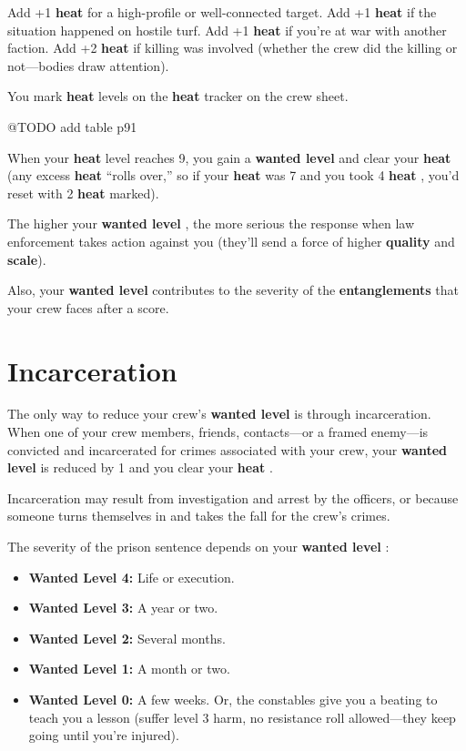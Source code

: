 \documentclass[11pt,oneside]{book}
\newcommand{\gameterm}[1]{\textbf{#1}}
\begin{document}
Add +1 \gameterm{heat}  for a high-profile or well-connected target. Add +1 \gameterm{heat}  if the situation happened on hostile turf. Add +1 \gameterm{heat}  if you’re at war with another faction. Add +2 \gameterm{heat}  if killing was involved (whether the crew did the killing or not---bodies draw attention).

You mark \gameterm{heat}  levels on the \gameterm{heat}  tracker on the crew sheet.

@TODO add table p91

When your \gameterm{heat}  level reaches 9, you gain a \gameterm{wanted level}  and clear your \gameterm{heat}  (any excess \gameterm{heat}  “rolls over,” so if your \gameterm{heat}  was 7 and you took 4 \gameterm{heat} , you’d reset with 2 \gameterm{heat}  marked).

The higher your \gameterm{wanted level} , the more serious the response when law enforcement takes action against you (they’ll send a force of higher \textbf{quality} and \textbf{scale}).

Also, your \gameterm{wanted level}  contributes to the severity of the \textbf{entanglements} that your crew faces after a score.

\section{Incarceration}

The only way to reduce your crew’s \gameterm{wanted level}  is through incarceration. When one of your crew members, friends, contacts---or a framed enemy---is convicted and incarcerated for crimes associated with your crew, your \gameterm{wanted level}  is reduced by 1 and you clear your \gameterm{heat} .

Incarceration may result from investigation and arrest by the officers, or because someone turns themselves in and takes the fall for the crew’s crimes.

The severity of the prison sentence depends on your \gameterm{wanted level} :

\begin{itemize}
	\item \gameterm{Wanted Level 4: } Life or execution.
	\item \gameterm{Wanted Level 3:}  A year or two.
	\item \gameterm{Wanted Level 2:}  Several months.
	\item \gameterm{Wanted Level 1:}  A month or two.
	\item \gameterm{Wanted Level 0:}  A few weeks. Or, the constables give you a beating to teach you a lesson (suffer level 3 harm, no resistance roll allowed---they keep going until you’re injured).
\end{itemize}
\end{document}
